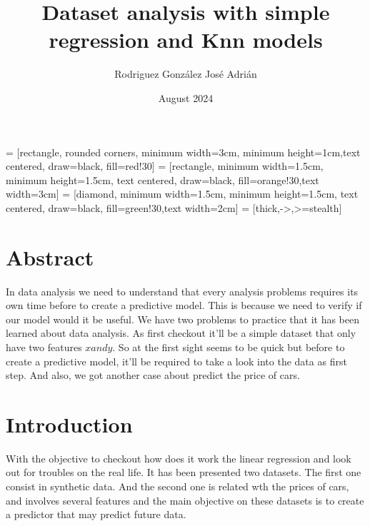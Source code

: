 \documentclass{article}
\title{Dataset analysis with simple regression and Knn models}
\author{Rodriguez González José Adrián }
\date{August 2024}
\begin{document}
\maketitle
{} = [rectangle, rounded corners, minimum width=3cm, minimum height=1cm,text centered, draw=black, fill=red!30]
 = [rectangle, minimum width=1.5cm, minimum height=1.5cm, text centered, draw=black, fill=orange!30,text width=3cm]
 = [diamond,  minimum width=1.5cm, minimum height=1.5cm, text centered, draw=black, fill=green!30,text width=2cm]
 = [thick,->,>=stealth]
\section{Abstract}
In data analysis we need to understand that every analysis problems requires its own time before to create a predictive model. This is because we need to verify if our model would it be useful.
We have two problems to practice that it has been learned about data analysis. As first checkout it'll be a simple dataset that only have two features \(x and y\). So at the first sight seems to be quick but before to create a predictive model, it'll be required to take a look into the data as first step. And also, we got another case about predict the price of cars.
\section{Introduction}
With the objective to checkout how does it work the linear regression and look out for troubles on the real life. It has been presented two datasets. The first one consist in synthetic data.
And the second one is related wth the prices of cars, and involves several features and the main objective on these datasets is to create a predictor that may predict future data.
\end{document}
